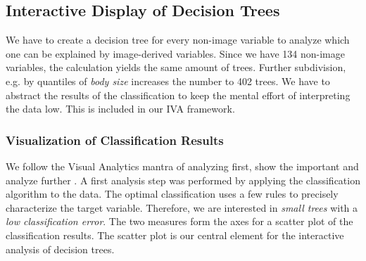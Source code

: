 \documentclass[a4paper,twoside]{style/article}
\begin{document}
\subsection{Interactive Display of Decision Trees}
We have to create a decision tree for every non-image variable to analyze which one can be explained by image-derived variables.
Since we have 134 non-image variables, the calculation yields the same amount of trees.
Further subdivision, e.g. by quantiles of \emph{body size} increases the number to 402 trees.
We have to abstract the results of the classification to keep the mental effort of interpreting the data low.
This is included in our IVA framework.
\subsubsection{Visualization of Classification Results}
\label{subsec:VisualizationOfClassificationResults}
We follow the Visual Analytics mantra of analyzing first, show the important and analyze further \cite{Keim}.
A first analysis step was performed by applying the classification algorithm to the data.
The optimal classification uses a few rules to precisely characterize the target variable.
Therefore, we are interested in \emph{small trees} with a \emph{low classification error}.
The two measures form the axes for a scatter plot of the classification results.
The scatter plot is our central element for the interactive analysis of decision trees.
\end{document}
